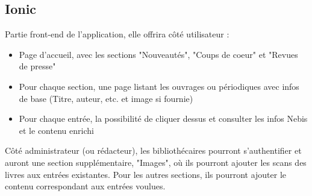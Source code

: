 \documentclass[a4paper, 12pt]{article}
\begin{document}
\subsection{Ionic}
Partie front-end de l'application, elle offrira côté utilisateur :
\begin{itemize}
	\item Page d'accueil, avec les sections "Nouveautés", "Coups de coeur" et "Revues de presse"
	\item Pour chaque section, une page listant les ouvrages ou périodiques avec infos de base 
		(Titre, auteur, etc. et image si fournie)
	\item Pour chaque entrée, la possibilité de cliquer dessus et consulter les infos Nebis et le contenu enrichi
\end{itemize}
Côté administrateur (ou rédacteur), les bibliothécaires pourront s'authentifier et auront une section supplémentaire, 
"Images", où ils pourront ajouter les scans des livres aux entrées existantes. Pour les autres sections, ils 
pourront ajouter le contenu correspondant aux entrées voulues.
\end{document}
